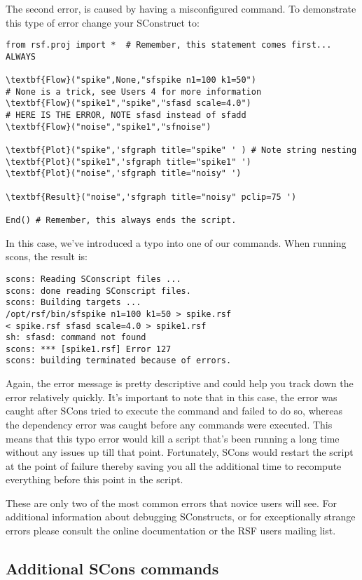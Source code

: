 The second error, is caused by having a misconfigured command.  To demonstrate this type of error change your SConstruct to:

\begin{lstlisting}
from rsf.proj import *  # Remember, this statement comes first... ALWAYS

\textbf{Flow}("spike",None,"sfspike n1=100 k1=50") 
# None is a trick, see Users 4 for more information
\textbf{Flow}("spike1","spike","sfasd scale=4.0") 
# HERE IS THE ERROR, NOTE sfasd instead of sfadd
\textbf{Flow}("noise","spike1","sfnoise")

\textbf{Plot}("spike",'sfgraph title="spike" ' ) # Note string nesting
\textbf{Plot}("spike1",'sfgraph title="spike1" ') 
\textbf{Plot}("noise",'sfgraph title="noisy" ')

\textbf{Result}("noise",'sfgraph title="noisy" pclip=75 ')

End() # Remember, this always ends the script.
\end{lstlisting}
In this case, we've introduced a typo into one of our commands.  When running scons, the result is:
\begin{verbatim}
scons: Reading SConscript files ...
scons: done reading SConscript files.
scons: Building targets ...
/opt/rsf/bin/sfspike n1=100 k1=50 > spike.rsf
< spike.rsf sfasd scale=4.0 > spike1.rsf
sh: sfasd: command not found
scons: *** [spike1.rsf] Error 127
scons: building terminated because of errors.
\end{verbatim}
Again, the error message is pretty descriptive and could help you track down the error relatively quickly.  It's important to note that in this case, the error was caught after SCons tried to execute the command and failed to do so, whereas the dependency error was caught before any commands were executed.  This means that this typo error would kill a script that's been running a long time without any issues up till that point.  Fortunately, SCons would restart the script at the point of failure thereby saving you all the additional time to recompute everything before this point in the script.

These are only two of the most common errors that novice users will see.  For additional information about debugging SConstructs, or for exceptionally strange errors please consult the online documentation or the RSF users mailing list.

\subsection{Additional SCons commands}

